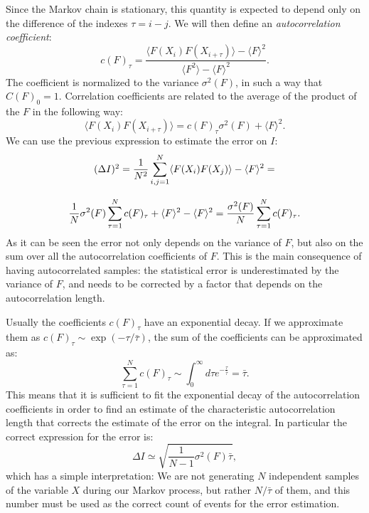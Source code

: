   Since the Markov chain is stationary, this quantity is expected to depend only on the difference of the indexes $\tau=i-j$. We will then define an {\it autocorrelation coefficient}:
  \begin{equation}
  c(F)_\tau =\frac{\langle F(X_i)F(X_{i+\tau})\rangle - \langle F\rangle^2}{\langle F^2\rangle - \langle F\rangle^2}.
  \end{equation}
  The coefficient is normalized to the variance  $\sigma^2(F)$, in such a way that $C(F)_0=1$. Correlation coefficients are related to the average of the product of the $F$ in the following way:
  \begin{equation}
  \langle F(X_i)F(X_{i+\tau})\rangle=c(F)_\tau\sigma^2(F)+\langle F\rangle^2.
  \end{equation} 
  We can use the previous expression to estimate the error on $I$:
  \begin{eqnarray}
  \begin{array}{c}
  (\Delta I)^2 = \displaystyle\frac{1}{N^2}\sum_{i,j=1}^N \langle F(X_i)F(X_j)\rangle-\langle F\rangle^2=\\ \\ 
  \displaystyle\frac{1}{N}\sigma^2(F)\sum_{\tau=1}^N c(F)_\tau +\langle F\rangle^2-\langle F\rangle^2= \frac{\sigma^2(F)}{N}\sum_{\tau=1}^N c(F)_\tau.
  \displaystyle 
  \end{array}
  \end{eqnarray}
As it can be seen the error not only depends on the variance of $F$, but also on the sum over all the autocorrelation coefficients of $F$. This is the main consequence of having autocorrelated samples: the statistical error is underestimated by the variance of $F$, and needs to be corrected by a factor that depends on the autocorrelation length. 

Usually the coefficients $c(F)_\tau$ have an exponential decay. If we approximate them as 
$c(F)_\tau \sim \exp(-\tau/{\bar{\tau}})$, the sum of the coefficients can be approximated as:
\begin{equation}
\sum_{\tau=1}^{N}c(F)_\tau\sim\int_{0}^{\infty} d\tau e^{-\frac{\tau}{\bar{\tau}}}=\bar{\tau}.
\end{equation}
This means that it is sufficient to fit the exponential decay of the autocorrelation coefficients in order to find an estimate of the characteristic autocorrelation length that corrects the estimate of the error on the integral. In particular the correct expression for the error is:
\begin{equation}
\Delta I\simeq\sqrt{\frac{1}{N-1}\sigma^2(F)\bar{\tau}},
\end{equation}
which has a simple interpretation: We are not generating $N$ independent samples of the variable $X$ during our Markov process, but rather $N/\bar{\tau}$ of them, and this number must be used as the correct count of events for the error estimation.

